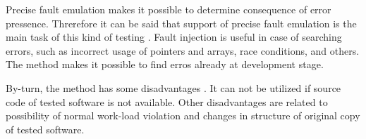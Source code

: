 %
Precise fault emulation makes it possible to determine consequence of error pressence. 
%
Threrefore it can be said that support of precise fault emulation is the main task of this kind of testing . 
%
Fault injection is useful in case of searching errors, such as incorrect usage of pointers and arrays, race conditions, and others. 
%
The method makes it possible to find erros already at development stage. 

%
By-turn, the method has some disadvantages . 
%
It can not be utilized if source code of tested software is not available. 
%
Other disadvantages are related to possibility of normal work-load violation and changes in structure of original copy of tested software. 